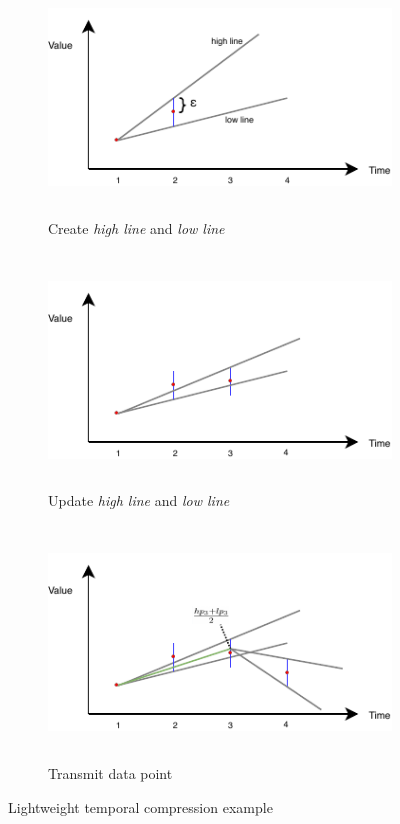 \begin{figure}
    \centering
    \begin{subfigure}{\columnwidth}
        \centering
        \includegraphics[height=6.2cm, width=.8\columnwidth]{figures/LTC-a.pdf}
        \caption{Create \emph{high line} and \emph{low line}}
        \label{fig:ltc-review-a}
    \end{subfigure}
    \centering
    \begin{subfigure}{\columnwidth}
        \centering
        \includegraphics[height=6.2cm, width=.8\columnwidth]{figures/LTC-b.pdf}
        \caption{Update \emph{high line} and \emph{low line}}
        \label{fig:ltc-review-b}
    \end{subfigure}
    \centering
    \begin{subfigure}{\columnwidth}
        \centering
        \includegraphics[height=6.2cm, width=.8\columnwidth]{figures/LTC-c.pdf}
        \caption{Transmit data point}
        \label{fig:ltc-review-c}
    \end{subfigure}
    \caption{Lightweight temporal compression example}
    \label{fig:ltc-review}
\end{figure}



